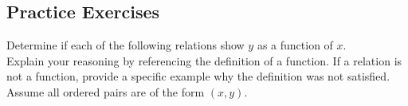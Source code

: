 

\newpage





\subsection*{Practice Exercises} \label{practice-functions-and-notation}

\begin{myPractice}
Determine if each of the following relations show $y$ as a function of $x$.  \\
Explain your reasoning by referencing the definition of a function.  If a relation is not a function, provide a specific example why the definition was not satisfied.\\
Assume all ordered pairs are of the form $(x,y)$.


\end{myPractice}

